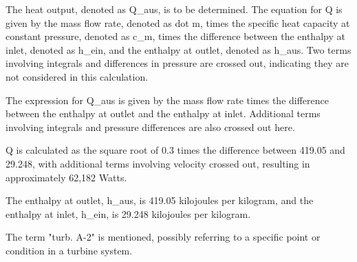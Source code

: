 The heat output, denoted as Q_aus, is to be determined. The equation for Q is given by the mass flow rate, denoted as dot m, times the specific heat capacity at constant pressure, denoted as c_m, times the difference between the enthalpy at inlet, denoted as h_ein, and the enthalpy at outlet, denoted as h_aus. Two terms involving integrals and differences in pressure are crossed out, indicating they are not considered in this calculation.

The expression for Q_aus is given by the mass flow rate times the difference between the enthalpy at outlet and the enthalpy at inlet. Additional terms involving integrals and pressure differences are also crossed out here.

Q is calculated as the square root of 0.3 times the difference between 419.05 and 29.248, with additional terms involving velocity crossed out, resulting in approximately 62,182 Watts.

The enthalpy at outlet, h_aus, is 419.05 kilojoules per kilogram, and the enthalpy at inlet, h_ein, is 29.248 kilojoules per kilogram.

The term "turb. A-2" is mentioned, possibly referring to a specific point or condition in a turbine system.